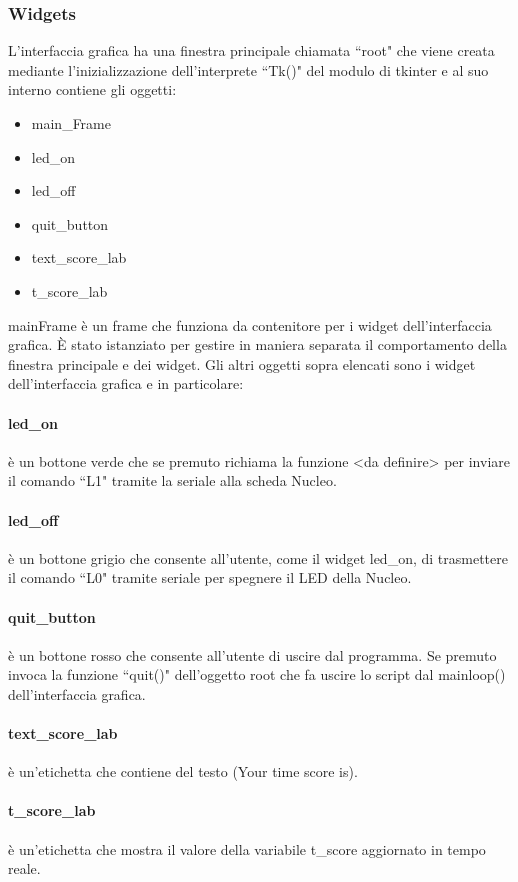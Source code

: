 \documentclass[a4paper]{article}
\begin{document}
\subsubsection{Widgets}
L'interfaccia grafica ha una finestra principale chiamata ``root" che viene creata mediante l'inizializzazione dell'interprete ``Tk()" del modulo di tkinter e al suo interno contiene gli oggetti:
\begin{itemize}
	\item main\_Frame
	\item led\_on
	\item led\_off
	\item quit\_button
	\item text\_score\_lab
	\item t\_score\_lab
\end{itemize}
mainFrame è un frame che funziona da contenitore per i widget dell'interfaccia grafica. \`E stato istanziato per gestire in maniera separata il comportamento della finestra principale e dei widget.
Gli altri oggetti sopra elencati sono i widget dell'interfaccia grafica e in particolare:
\paragraph{led\_on} è un bottone verde che se premuto richiama la funzione <da definire> per inviare il comando ``L1" tramite la seriale alla scheda Nucleo.
\paragraph{led\_off} è un bottone grigio che consente all'utente, come il widget led\_on, di trasmettere il comando ``L0" tramite seriale per spegnere il LED della Nucleo.
\paragraph{quit\_button} è un bottone rosso che consente all'utente di uscire dal programma. Se premuto invoca la funzione ``quit()" dell'oggetto root che fa uscire lo script dal mainloop() dell'interfaccia grafica.
\paragraph{text\_score\_lab} è un'etichetta che contiene del testo (Your time score is).
\paragraph{t\_score\_lab} è un'etichetta che mostra il valore della variabile t\_score aggiornato in tempo reale.
\end{document}
